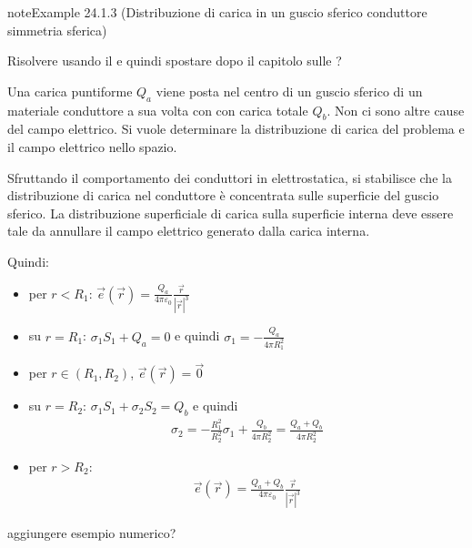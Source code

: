 \documentclass[letterpaper,10pt,italian]{jupyterBook}
\begin{document}
\begin{sphinxadmonition}{note}{Example 24.1.3 (Distribuzione di carica in un guscio sferico conduttore \sphinxhyphen{} simmetria sferica)}



\sphinxAtStartPar
{} Risolvere usando il {\hyperref[\detokenize{ch/electromagnetism/electrostatics:physics-hs-electromagnetism-electrostatics-maxwell-gauss}]{}} e quindi spostare dopo il capitolo sulle {\hyperref[\detokenize{ch/electromagnetism/electrostatics:physics-hs-electromagnetism-electrostatics-maxwell}]{}}?

\sphinxAtStartPar
Una carica puntiforme \(Q_a\) viene posta nel centro di un guscio sferico di un materiale conduttore a sua volta con con carica totale \(Q_b\). Non ci sono altre cause del campo elettrico. Si vuole determinare la distribuzione di carica del problema e il campo elettrico nello spazio.

\sphinxAtStartPar
Sfruttando il comportamento dei conduttori in elettrostatica, si stabilisce che la distribuzione di carica nel conduttore è concentrata sulle superficie del guscio sferico. La distribuzione superficiale di carica sulla superficie interna deve essere tale da annullare il campo elettrico generato dalla carica interna.

\sphinxAtStartPar
Quindi:
\begin{itemize}
\item {} 
\sphinxAtStartPar
per \(r < R_1\): \(\vec{e}(\vec{r}) = \frac{Q_a}{4 \pi \varepsilon_0}\frac{\vec{r}}{|\vec{r}|^3} \)

\item {} 
\sphinxAtStartPar
su \(r = R_1\): \(\sigma_1 S_1 + Q_a = 0\) e quindi \(\sigma_1 = -\frac{Q_a}{4 \pi R_1^2}\)

\item {} 
\sphinxAtStartPar
per \(r \in (R_1, R_2)\), \(\vec{e}(\vec{r}) = \vec{0}\)

\item {} 
\sphinxAtStartPar
su \(r = R_2\): \(\sigma_1 S_1 + \sigma_2 S_2 = Q_b\) e quindi
\begin{equation*}
\begin{split}\sigma_2 = - \frac{R_1^2}{R_2^2} \sigma_1 + \frac{Q_b}{4 \pi R_2^2} = \frac{Q_a + Q_b}{4 \pi R_2^2}\end{split}
\end{equation*}
\item {} 
\sphinxAtStartPar
per \(r > R_2\):
\begin{equation*}
\begin{split}\vec{e}(\vec{r}) = \frac{Q_a + Q_b}{4 \pi \varepsilon_0} \frac{\vec{r}}{|\vec{r}|^3}\end{split}
\end{equation*}
\end{itemize}

\sphinxAtStartPar
{} aggiungere esempio numerico?
\end{sphinxadmonition}
\end{document}
